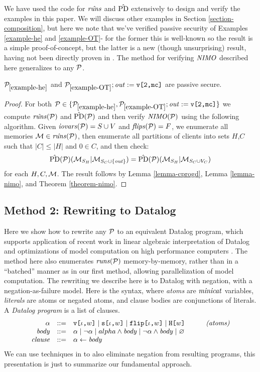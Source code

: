 We have used the code for $\hat{\mathit{runs}}$ and $\hat{\mathrm{PD}}$ extensively to design and
verify the examples in this paper. We will discuss other examples in
Section \ref{section-composition}, but here we note that we've verified
passive security of Examples \ref{example-he} and \ref{example-OT}-
for the former this is well-known so the result is a simple proof-of-concept,
but the latter is a new (though unsurprising) result, having not been
directly proven in \cite{XXX}. The method for
verifying $\mathit{NIMO}$ described here generalizes to any $\mathcal{P}$. 
\begin{lemma}
  $\mathcal{P}_{\ref{example-he}}$ and $\mathcal{P}_{\ref{example-OT}};\mathit{out} := \texttt{v[2,mc]}$ are
  passive secure.
\end{lemma}
\begin{proof}
  For both $\mathcal{P} \in \{
  \mathcal{P}_{\ref{example-he}},\mathcal{P}_{\ref{example-OT}};\mathit{out} := \texttt{v[2,mc]}\}$
  we compute $\hat{\mathit{runs}}(\mathcal{P})$ and $\hat{\mathrm{PD}}(\mathcal{P})$ and then verify
  $\mathit{NIMO}(\mathcal{P})$ using the following algorithm. Given $\mathit{iovars}(\mathcal{P}) = S
  \cup V$ and $\mathit{flips}(\mathcal{P}) = F$, we enumerate all memories $\mathcal{M}
  \in \hat{\mathit{runs}}(\mathcal{P})$, then enumerate all partitions of clients into
  sets $H$,$C$ such that $|C| \le |H|$ and $0 \in C$, and then check:
  $$
  \hat{\mathrm{PD}}(\mathcal{P})(\mathcal{M}_{S_H}|\mathcal{M}_{S_C \cup \{\mathit{out}\}}) =
  \hat{\mathrm{PD}}(\mathcal{P})(\mathcal{M}_{S_H}|\mathcal{M}_{S_C \cup V_C})
  $$
  for each $H,C,\mathcal{M}$. The result follows by Lemma \ref{lemma-cprogd}, Lemma \ref{lemma-nimo}, and
  Theorem \ref{theorem-nimo}.
\end{proof}

\subsection{Method 2: Rewriting to Datalog}
\label{section-bruteforce-datalog}

Here we show how to rewrite any $\mathcal{P}$ to an equivalent Datalog
program, which supports application of recent work in linear algebraic
interpretation of Datalog and optimizations of model computation on
high performance computers \cite{XXX}. The method here also enumerates
$\mathit{runs}(\mathcal{P})$ memory-by-memory, rather than in a ``batched'' manner
as in our first method, allowing parallelization of model
computation. The rewriting we describe here is to Datalog with
negation, with a negation-as-failure model. Here is the syntax,
where \emph{atoms} are $\mathit{minicat}$ variables, \emph{literals}
are atoms or negated atoms, and clause bodies are conjunctions of literals.
A \emph{Datalog program} is a list of clauses.
$$
\begin{array}{rclr}
  \alpha &::=& \texttt{v[}\iota\texttt{,}w\texttt{]} \mid  \texttt{s[}\iota\texttt{,}w\texttt{]} \mid \texttt{flip[}\iota\texttt{,}w\texttt{]} \mid \texttt{H[}w\texttt{]} & \qquad \textit{(atoms)}\\
  \mathit{body} &::=&  \alpha \mid \neg \alpha \mid alpha \wedge \mathit{body} \mid \neg\alpha \wedge \mathit{body} \mid \varnothing \\
  \mathit{clause} &::=& \alpha \gets \mathit{body}
\end{array}
$$
We can use techniques in \cite{XXX} to also eliminate negation from
resulting programs, this presentation is just to summarize our
fundamental approach.

